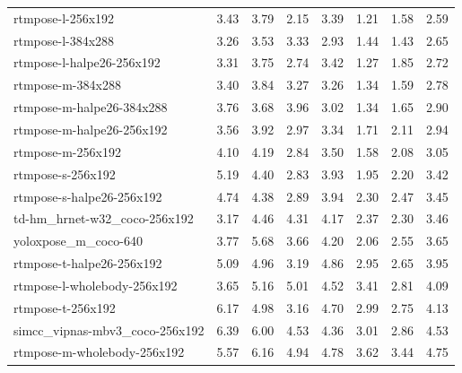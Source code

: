 \begin{tabular}{p{3.5cm} rrrrrrr}
    \midrule
    rtmpose-l-256x192                & 3.43           & 3.79          & 2.15         & 3.39              & 1.21           & 1.58           & 2.59          \\
    rtmpose-l-384x288                & 3.26           & 3.53          & 3.33         & 2.93              & 1.44           & 1.43           & 2.65          \\
    rtmpose-l-halpe26-256x192        & 3.31           & 3.75          & 2.74         & 3.42              & 1.27           & 1.85           & 2.72          \\
    rtmpose-m-384x288                & 3.40           & 3.84          & 3.27         & 3.26              & 1.34           & 1.59           & 2.78          \\
    rtmpose-m-halpe26-384x288        & 3.76           & 3.68          & 3.96         & 3.02              & 1.34           & 1.65           & 2.90          \\
    rtmpose-m-halpe26-256x192        & 3.56           & 3.92          & 2.97         & 3.34              & 1.71           & 2.11           & 2.94          \\
    rtmpose-m-256x192                & 4.10           & 4.19          & 2.84         & 3.50              & 1.58           & 2.08           & 3.05          \\
    rtmpose-s-256x192                & 5.19           & 4.40          & 2.83         & 3.93              & 1.95           & 2.20           & 3.42          \\
    rtmpose-s-halpe26-256x192        & 4.74           & 4.38          & 2.89         & 3.94              & 2.30           & 2.47           & 3.45          \\
    td-hm\_hrnet-w32\_coco-256x192   & 3.17           & 4.46          & 4.31         & 4.17              & 2.37           & 2.30           & 3.46          \\
    yoloxpose\_m\_coco-640           & 3.77           & 5.68          & 3.66         & 4.20              & 2.06           & 2.55           & 3.65          \\
    rtmpose-t-halpe26-256x192        & 5.09           & 4.96          & 3.19         & 4.86              & 2.95           & 2.65           & 3.95          \\
    rtmpose-l-wholebody-256x192      & 3.65           & 5.16          & 5.01         & 4.52              & 3.41           & 2.81           & 4.09          \\
    rtmpose-t-256x192                & 6.17           & 4.98          & 3.16         & 4.70              & 2.99           & 2.75           & 4.13          \\
    simcc\_vipnas-mbv3\_coco-256x192 & 6.39           & 6.00          & 4.53         & 4.36              & 3.01           & 2.86           & 4.53          \\
    rtmpose-m-wholebody-256x192      & 5.57           & 6.16          & 4.94         & 4.78              & 3.62           & 3.44           & 4.75          \\
    \bottomrule
\end{tabular}


